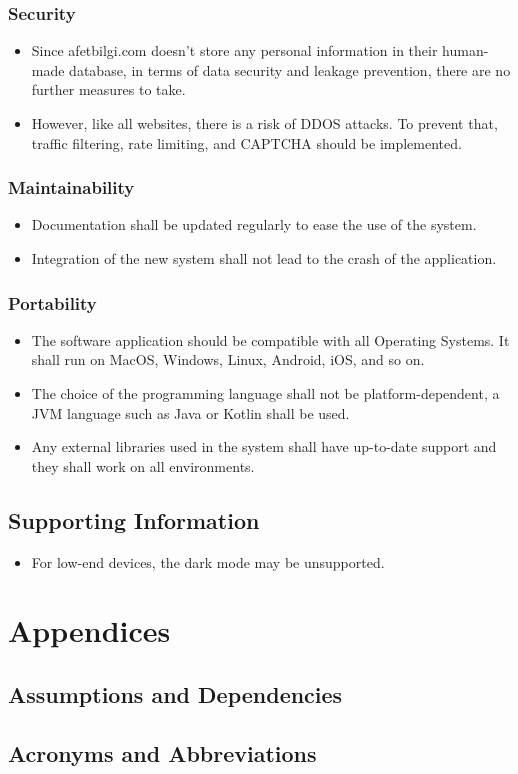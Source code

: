 \documentclass[listof=nochaptergap]{report}
\begin{document}
\subsection{Security}
\begin{itemize}
    \item Since afetbilgi.com doesn't store any personal information in their human-made database, in terms of data security and leakage prevention, there are no further measures to take.
    \item However, like all websites, there is a risk of DDOS attacks. To prevent that, traffic filtering, rate limiting, and CAPTCHA should be implemented.
\end{itemize}

\subsection{Maintainability}
\begin{itemize}
    \item Documentation shall be updated regularly to ease the use of the system.
    \item Integration of the new system shall not lead to the crash of the application.
\end{itemize}

\subsection{Portability}
\begin{itemize}
    \item The software application should be compatible with all Operating Systems. It shall run on MacOS, Windows, Linux, Android, iOS, and so on.
    \item The choice of the programming language shall not be platform-dependent, a JVM language such as Java or Kotlin shall be used.
    \item Any external libraries used in the system shall have up-to-date support and they shall work on all environments.
\end{itemize}

\section{Supporting Information}
\begin{itemize}
    \item For low-end devices, the dark mode may be unsupported.
\end{itemize}

\chapter{Appendices}
\section{Assumptions and Dependencies}
\section{Acronyms and Abbreviations}
\end{document}
